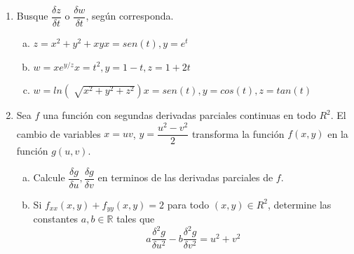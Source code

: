 \documentclass[12pt]{article}
\newenvironment{preguntas}
{\begin{enumerate}\itemsep12pt
	}
	{
	\end{enumerate}
}
\newcommand{\R}{\mathbb{R}}
\begin{document}
\begin{preguntas}
	$$f(x,y) = xy + 3x^2 -y^3$$
\item Busque $\dfrac{\delta z}{\delta t}$ o $\dfrac{\delta w}{\delta t}$, según corresponda.
\begin{enumerate}[a)]
\item $z = x^2+y^2+xy$\tab$x=sen(t), y=e^t$
\item $w=xe^{y/z}$\tab$x=t^2, y=1-t, z=1+2t$
\item $w=ln(\sqrt[]{x^2+y^2+z^2})$\tab$x=sen(t), y=cos(t), z=tan(t)$
\end{enumerate}
\item Sea $f$ una función con segundas derivadas parciales continuas en todo $R^2$. El cambio de variables $x=uv$, $y=\dfrac{u^2-v^2}{2}$ transforma la función $f(x,y)$ en la función $g(u,v)$.
\begin{enumerate}[a)]
\item Calcule $\dfrac{\delta g}{\delta u}, \dfrac{\delta g}{\delta v}$ en terminos de las derivadas parciales de $f$.
\item Si $f_{xx}(x,y) + f_{yy}(x,y) = 2$ para todo $(x,y) \in R^2$, determine las constantes $a,b \in \R$ tales que
		$$a\dfrac{\delta^2g}{\delta u^2} - b\dfrac{\delta^2 g}{\delta v^2} = u^2 + v^2$$
\end{enumerate}
\end{preguntas}
\end{document}
